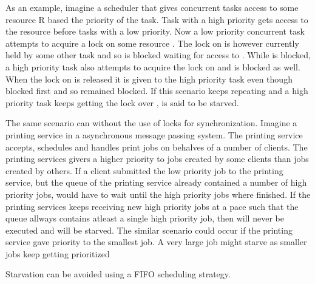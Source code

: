 As an example, imagine a scheduler that gives concurrent tasks access to some resource R based the priority of the task. Task with a high priority gets access to the resource before tasks with a low priority. Now a low priority concurrent task  attempts to acquire a lock on some resource . The lock on  is however currently held by some other task and so  is blocked waiting for access to . While  is blocked, a high priority task  also attempts to acquire the lock on  and is blocked as well. When the lock on  is released it is given to the high priority task  even though  blocked first and so  remained blocked. If this scenario keeps repeating and a high priority task keeps getting the lock over ,  is said to be starved.

The same scenario can without the use of locks for synchronization. Imagine a printing service in a asynchronous message passing system. The printing service accepts, schedules and handles print jobs on behalves of a number of clients. The printing services givers a higher priority to jobs created by some clients than jobs created by others. If a client submitted the low priority job  to the printing service, but the queue of the printing service already contained a number of high priority jobs,  would have to wait until the high priority jobs where finished. If the printing services keeps receiving new high priority jobs at a pace such that the queue allways contains atleast a single high priority job, then  will never be executed and will be starved. The similar scenario could occur if the printing service gave priority to the smallest job. A very large job might starve as smaller jobs keep getting prioritized

Starvation can be avoided using a \ac{FIFO} scheduling strategy\cite[p. 459]{tanenbaum2008modern}.

 
\worksheetend
